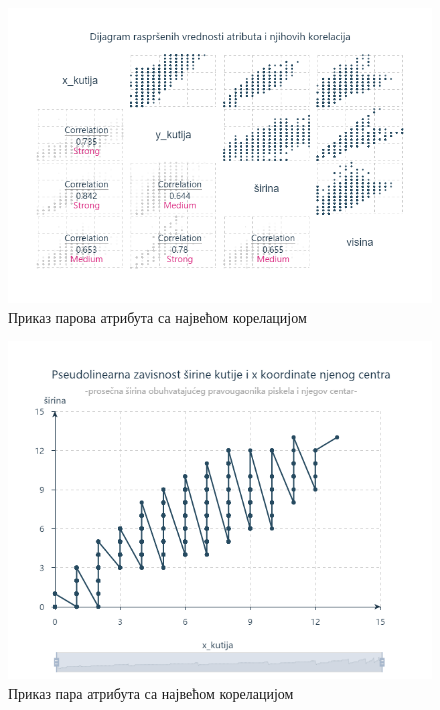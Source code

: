 \documentclass[a4paper]{article}
\begin{document}
\begin{figure}[h!]
\begin{center}
\includegraphics[scale=0.65]{../Slike za rad/Scatterplot.png}
\end{center}
\caption{Приказ парова атрибута са највећом корелацијом}
\label{scatter}
\end{figure}

\begin{figure}[h!]
\begin{center}
\includegraphics[scale=0.75]{../Slike za rad/Linearna zavisnost.png}
\end{center}
\caption{Приказ пара атрибута са највећом корелацијом}
\label{linzav}
\end{figure}
\end{document}
